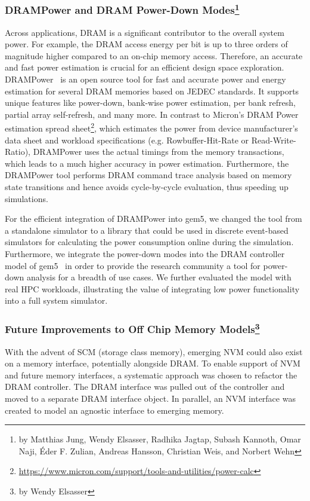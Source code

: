\subsubsection[DRAMPower and DRAM Power-Down Modes]{DRAMPower and DRAM Power-Down Modes\footnote{by Matthias Jung, Wendy Elsasser, Radhika Jagtap, Subash Kannoth, Omar Naji, Éder F.
Zulian, Andreas Hansson, Christian Weis, and Norbert Wehn }}
%
Across applications, DRAM is a significant contributor to the overall system power.
For example, the DRAM access energy per bit is up to three orders of magnitude higher compared to an on-chip memory access.
Therefore, an accurate and fast power estimation is crucial for an efficient design space exploration.
DRAMPower~\cite{kargoo_14} is an open source tool for fast and accurate power and energy estimation for several DRAM memories based on JEDEC standards.
It supports unique features like power-down, bank-wise power estimation, per bank refresh, partial array self-refresh, and many more.
In contrast to Micron’s DRAM Power estimation spread sheet\footnote{\url{https://www.micron.com/support/tools-and-utilities/power-calc}}, which estimates the power from device manufacturer’s data sheet and workload specifications (e.g. Rowbuffer-Hit-Rate or Read-Write-Ratio), DRAMPower uses the actual timings from the memory transactions, which leads to a much higher accuracy in power estimation.
Furthermore, the DRAMPower tool performs DRAM command trace analysis based on memory state transitions and hence avoids cycle-by-cycle evaluation, thus speeding up simulations.

For the efficient integration of DRAMPower into gem5, we changed the tool from a standalone simulator to a library that could be used in discrete event-based simulators for calculating the power consumption online during the simulation.
Furthermore, we integrate the power-down modes into the DRAM controller model of gem5~\cite{jagjun_17} in order to provide the research community a tool for power-down analysis for a breadth of use cases. We further evaluated the model with real HPC workloads, illustrating the value of integrating low power functionality into a full system simulator.
%
\subsubsection[Future Improvements to Off Chip Memory Models]{Future Improvements to Off Chip Memory Models\footnote{by Wendy Elsasser}}

With the advent of SCM (storage class memory), emerging NVM could also exist on a memory interface, potentially alongside DRAM.
To enable support of NVM and future memory interfaces, a systematic approach was chosen to refactor the DRAM controller.
The DRAM interface was pulled out of the controller and moved to a separate DRAM interface object.
In parallel, an NVM interface was created to model an agnostic interface to emerging memory.

